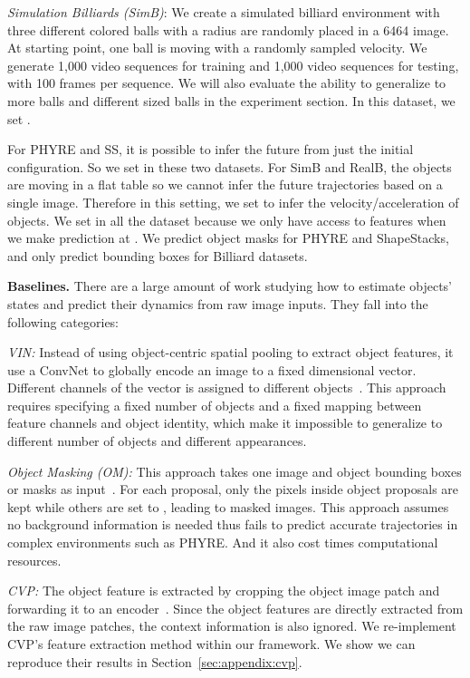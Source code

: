 \documentclass{article} \usepackage{iclr2021_conference,times}
\begin{document}
\textit{Simulation Billiards (SimB)}: We create a simulated billiard environment with three different colored balls with a radius  are randomly placed in a 6464 image. At starting point, one ball is moving with a randomly sampled velocity. We generate 1,000 video sequences for training and 1,000 video sequences for testing, with 100 frames per sequence. We will also evaluate the ability to generalize to more balls and different sized balls in the experiment section. In this dataset, we set .

For PHYRE and SS, it is possible to infer the future from just the initial configuration. So we set  in these two datasets. For SimB and RealB, the objects are moving in a flat table so we cannot infer the future trajectories based on a single image. Therefore in this setting, we set  to infer the velocity/acceleration of objects. We set  in all the dataset because we only have access to  features when we make prediction at . We predict object masks for PHYRE and ShapeStacks, and only predict bounding boxes for Billiard datasets. 

\textbf{Baselines.} There are a large amount of work studying how to estimate objects' states and predict their dynamics from raw image inputs. They fall into the following categories:

\textit{VIN:} Instead of using object-centric spatial pooling to extract object features, it use a ConvNet to globally encode an image to a fixed  dimensional vector. Different channels of the vector is assigned to different objects~\citep{kipf2019contrastive, watters2017visual}. This approach requires specifying a fixed number of objects and a fixed mapping between feature channels and object identity, which make it impossible to generalize to different number of objects and different appearances.

\textit{Object Masking (OM):} This approach takes one image and  object bounding boxes or masks as input~\citep{wu2017learning,veerapaneni2019entity,janner2018reasoning}. For each proposal, only the pixels inside object proposals are kept while others are set to , leading to  masked images. This approach assumes no background information is needed thus fails to predict accurate trajectories in complex environments such as PHYRE. And it also cost  times computational resources.

\textit{CVP:} The object feature is extracted by cropping the object image patch and forwarding it to an encoder~\citep{ye2019cvp,yi2019clevrer}. Since the object features are directly extracted from the raw image patches, the context information is also ignored. We re-implement CVP's feature extraction method within our framework. We show we can reproduce their results in Section~\ref{sec:appendix:cvp}.
\end{document}
